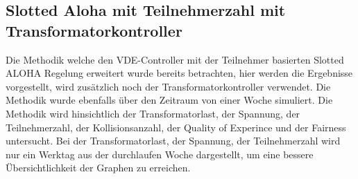 \subsection{Slotted Aloha mit Teilnehmerzahl mit Transformatorkontroller}
\label{chap_SAparT}
Die Methodik welche den VDE-Controller mit der Teilnehmer basierten Slotted ALOHA Regelung erweitert wurde bereits betrachten, hier werden die Ergebnisse vorgestellt, wird zusätzlich noch der Transformatorkontroller verwendet. Die Methodik wurde ebenfalls über den Zeitraum von einer Woche simuliert. Die Methodik wird hinsichtlich der Transformatorlast, der Spannung, der Teilnehmerzahl, der Kollisionsanzahl, der Quality of Experince und der Fairness untersucht. Bei der Transformatorlast, der Spannung, der Teilnehmerzahl wird nur ein Werktag aus der durchlaufen Woche dargestellt, um eine bessere Übersichtlichkeit der Graphen zu erreichen.\\
